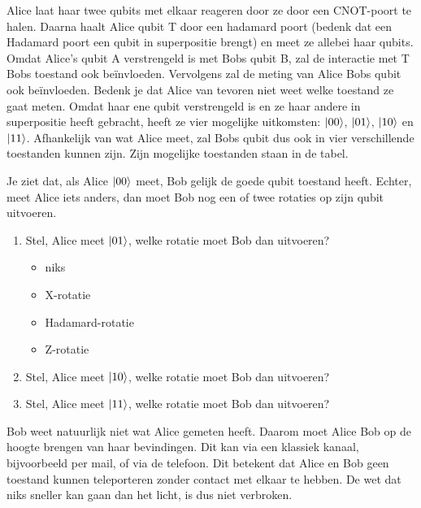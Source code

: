 \documentclass[../../main.tex]{subfiles}
\begin{document}
Alice laat haar twee qubits met elkaar reageren door ze door een CNOT-poort te halen.  Daarna haalt Alice qubit T door een hadamard poort (bedenk dat een Hadamard poort een qubit in superpositie brengt) en meet ze allebei haar qubits. Omdat Alice's qubit A verstrengeld is met Bobs qubit B, zal de interactie met T Bobs toestand ook be\"{i}nvloeden. Vervolgens zal de meting van Alice Bobs qubit ook be\"{i}nvloeden. Bedenk je dat Alice van tevoren niet weet welke toestand ze gaat meten. Omdat haar ene qubit verstrengeld is en ze haar andere in superpositie heeft gebracht, heeft ze vier mogelijke uitkomsten: $\ket{00}$, $\ket{01}$, $\ket{10}$ en $\ket{11}$. Afhankelijk van wat Alice meet, zal Bobs qubit dus ook in vier verschillende toestanden kunnen zijn. Zijn mogelijke toestanden staan in de tabel.


Je ziet dat, als Alice $\ket{00}$ meet, Bob gelijk de goede qubit toestand heeft. Echter, meet Alice iets anders, dan moet Bob nog een of twee rotaties op zijn qubit uitvoeren.

\begin{antwoord}
\end{antwoord}
\begin{opdracht}
\begin{enumerate}
\item Stel, Alice meet $\ket{01}$, welke rotatie moet Bob dan uitvoeren?
\begin{itemize}
\item niks
\item X-rotatie
\item Hadamard-rotatie
\item Z-rotatie
\end{itemize}

\item Stel, Alice meet $\ket{10}$, welke rotatie moet Bob dan uitvoeren?

\item Stel, Alice meet $\ket{11}$, welke rotatie moet Bob dan uitvoeren?

\end{enumerate}
\end{opdracht}
Bob weet natuurlijk niet wat Alice gemeten heeft. Daarom moet Alice Bob op de hoogte brengen van haar bevindingen. Dit kan via een klassiek kanaal, bijvoorbeeld per mail, of via de telefoon. Dit betekent dat Alice en Bob geen toestand kunnen teleporteren zonder contact met elkaar te hebben. De wet dat niks sneller kan gaan dan het licht, is dus niet verbroken.
\end{document}
